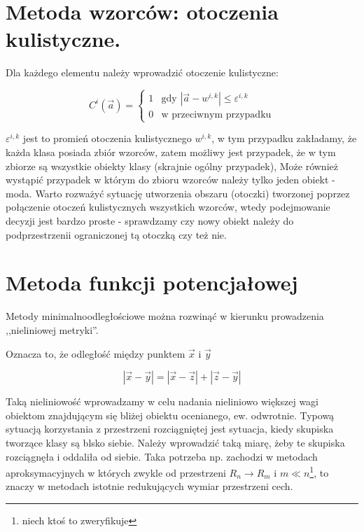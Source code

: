 \documentclass[a4paper,10pt]{article}
\begin{document}
\section{Metoda wzorców: otoczenia kulistyczne.}
Dla każdego elementu należy wprowadzić otoczenie kulistyczne:

\begin{equation}
 C^i(\overrightarrow{a}) = 
\begin{cases} 1 & \mbox{gdy $|\overrightarrow{a} - w^{i,k}| \leq \varepsilon^{i,k}$}\\
 0 & \mbox{w przeciwnym przypadku}
\end{cases}
\end{equation}

$\varepsilon^{i,k}$ jest to promień otoczenia kulistycznego $w^{i,k}$, w tym przypadku zakładamy, że każda klasa posiada zbiór wzorców, zatem możliwy jest przypadek, że w tym zbiorze są wszystkie obiekty klasy (skrajnie ogólny przypadek), Może również wystąpić przypadek w którym do zbioru wzorców należy tylko jeden obiekt - moda.
Warto rozważyć sytuację utworzenia obszaru (otoczki) tworzonej poprzez połączenie otoczeń kulistycznych wszystkich wzorców, wtedy podejmowanie decyzji jest bardzo proste - sprawdzamy czy nowy obiekt należy do podprzestrzenii ograniczonej tą otoczką czy też nie.

\section{Metoda funkcji potencjałowej}
Metody minimalnoodległościowe można rozwinąć w kierunku prowadzenia ,,nieliniowej metryki''.

Oznacza to, że odległość między punktem $\overrightarrow{x}$ i $\overrightarrow{y}$

\begin{equation}
|\overrightarrow{x} - \overrightarrow{y}| = |\overrightarrow{x} - \overrightarrow{z}| + |\overrightarrow{z} - \overrightarrow{y}|
\end{equation}

Taką nieliniowość wprowadzamy w celu nadania nieliniowo większej wagi obiektom znajdującym się bliżej obiektu ocenianego, ew. odwrotnie. Typową sytuacją korzystania z przestrzeni rozciągniętej jest sytuacja, kiedy skupiska tworzące klasy są blsko siebie. Należy wprowadzić taką miarę, żeby te skupiska rozciągnęła i oddaliła od siebie. Taka potrzeba np. zachodzi w metodach aproksymacyjnych w których zwykle od przestrzeni $R_n \rightarrow R_m$ i $m \ll n$\footnote{niech ktoś to zweryfikuje}, to znaczy w metodach istotnie redukujących wymiar przestrzeni cech.
\end{document}
